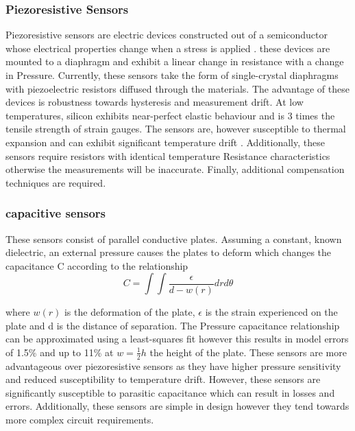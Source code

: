 \subsubsection{Piezoresistive Sensors}

Piezoresistive sensors are electric devices constructed out of a semiconductor whose electrical properties change when a stress is applied \cite{eaton1997micromachined}. these devices are mounted to a diaphragm and exhibit a linear change in resistance with a change in Pressure. Currently, these sensors take the form of single-crystal diaphragms with piezoelectric resistors diffused through the materials. The advantage of these devices is robustness towards hysteresis and measurement drift. At low temperatures, silicon exhibits near-perfect elastic behaviour and is  3 times the tensile strength of strain gauges\cite{eaton1997micromachined}. The sensors are, however susceptible to thermal expansion and can exhibit significant temperature drift \cite{samaun1971ic}. Additionally, these sensors require resistors with identical temperature Resistance characteristics otherwise the measurements will be inaccurate. Finally, additional compensation techniques are required.

\subsubsection{capacitive sensors}

These sensors consist of parallel conductive plates. Assuming a constant, known dielectric, an external pressure causes the plates to deform which changes the capacitance C according to the relationship \cite{eaton1997micromachined}
\begin{equation}
	C = \int \int \frac{\epsilon}{d - w(r)}drd\theta
\end{equation}

where $w(r)$ is the deformation of the plate, $\epsilon$ is the strain experienced on the plate and d is the distance of separation. The Pressure capacitance relationship can be approximated using a least-squares fit \cite{eaton1997micromachined} however this results in model errors of 1.5\% and up to 11\% at $w = \frac{1}{2}h$ the height of the plate. These sensors are more advantageous over piezoresistive sensors as they have higher pressure sensitivity and reduced susceptibility to temperature drift. However, these sensors are significantly susceptible to parasitic capacitance which can result in losses and errors. Additionally, these sensors are simple in design however they tend towards more complex circuit requirements.

